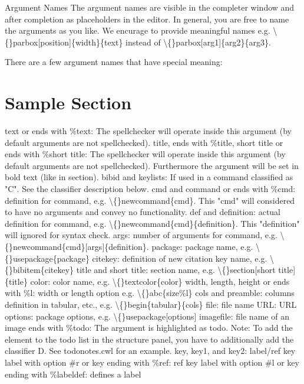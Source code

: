 \documentclass{article}
\begin{document}
	Argument Names
	The argument names are visible in the completer window and after completion as placeholders in the editor. In general, you are free to name the arguments as you like. We encurage to provide meaningful names e.g. \textbackslash\{\}parbox[position]\{width\}\{text\} instead of \textbackslash\{\}parbox[arg1]\{arg2\}\{arg3\}.
	
	There are a few argument names that have special meaning:
	
	
	\section{Sample Section}
	\label{sec:sample}
	
	text or ends with \%text: The spellchecker will operate inside this argument (by default arguments are not spellchecked).
	title, ends with \%title, short title or ends with \%short title: The spellchecker will operate inside this argument (by default arguments are not spellchecked). Furthermore the argument will be set in bold text (like in section).
	bibid and keylists: If used in a command classified as "C". See the classifier description below.
	cmd and command or ends with \%cmd: definition for command, e.g. \textbackslash\{\}newcommand\{cmd\}. This "cmd" will considered to have no arguments and convey no functionality.
	def and definition: actual definition for command, e.g. \textbackslash\{\}newcommand\{cmd\}\{definition\}. This "definition" will ignored for syntax check.
	args: number of arguments for command, e.g. \textbackslash\{\}newcommand\{cmd\}[args]\{definition\}.
	package: package name, e.g. \textbackslash\{\}usepackage\{package\}
	citekey: definition of new citation key name, e.g. \textbackslash\{\}bibitem\{citekey\}
	title and short title: section name, e.g. \textbackslash\{\}section[short title]\{title\}
	color: color name, e.g. \textbackslash\{\}textcolor\{color\}
	width, length, height or ends with \%l: width or length option e.g. \textbackslash\{\}abc\{size\%l\}
	cols and preamble: columns definition in tabular, etc., e.g. \textbackslash\{\}begin\{tabular\}\{cols\}
	file: file name
	URL: URL
	options: package options, e.g. \textbackslash\{\}usepackage[options]
	imagefile: file name of an image
	ends with \%todo: The argument is highlighted as todo. Note: To add the element to the todo list in the structure panel, you have to additionally add the classifier D. See todonotes.cwl for an example.
	key, key1, and key2: label/ref key
	label with option \#r or key ending with \%ref: ref key
	label with option \#l or key ending with \%labeldef: defines a label
\end{document}

